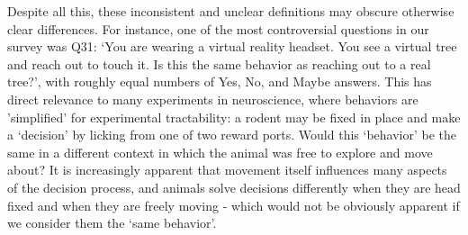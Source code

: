 \documentclass[a4paper, 11pt]{article}
\begin{document}


Despite all this, these inconsistent and unclear definitions may obscure otherwise clear differences. For instance, one of the most controversial questions in our survey was Q31: `You are wearing a virtual reality headset. You see a virtual tree and reach out to touch it. Is this the same behavior as reaching out to a real tree?', with roughly equal numbers of Yes, No, and Maybe answers. This has direct relevance to many experiments in neuroscience, where behaviors are 'simplified' for experimental tractability: a rodent may be fixed in place and make a `decision' by licking from one of two reward ports. Would this `behavior' be the same in a different context in which the animal was free to explore and move about? It is increasingly apparent that movement itself influences many aspects of the decision process, and animals solve decisions differently when they are head fixed and when they are freely moving \cite{eisenreich2019macaques} - which would not be obviously apparent if we consider them the `same behavior'.
\end{document}

